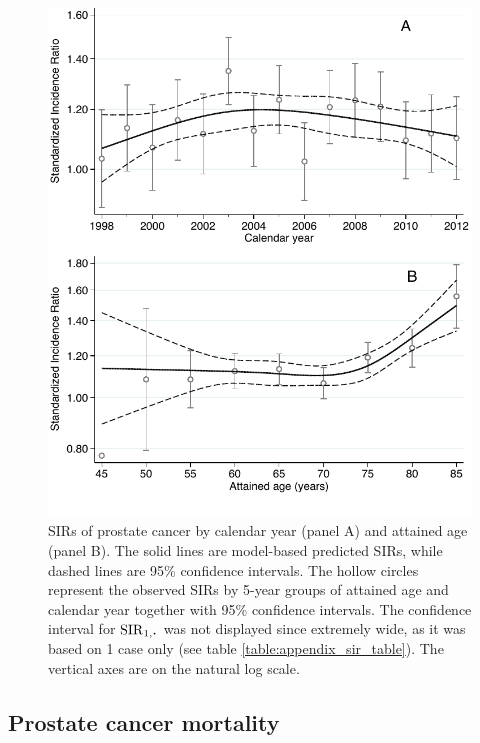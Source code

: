 \begin{figure}[p]
\centering
\includegraphics[width=\linewidth]{figures/sir.pdf}
\caption[Standardized Incidence Ratios of prostate cancer by calendar year and attained age]{SIRs of prostate cancer by calendar year (panel A) and attained age (panel B). The solid lines are model-based predicted SIRs, while dashed lines are 95\% confidence intervals. The hollow circles represent the observed SIRs by 5-year groups of attained age and calendar year together with 95\% confidence intervals. The confidence interval for $\SIR_{1,\LargerCdot}$ was not displayed since extremely wide, as it was based on 1 case only (see table \ref{table:appendix_sir_table}). The vertical axes are on the natural log scale.}
\label{fig:sir}
\end{figure}





\subsection{Prostate cancer mortality}

